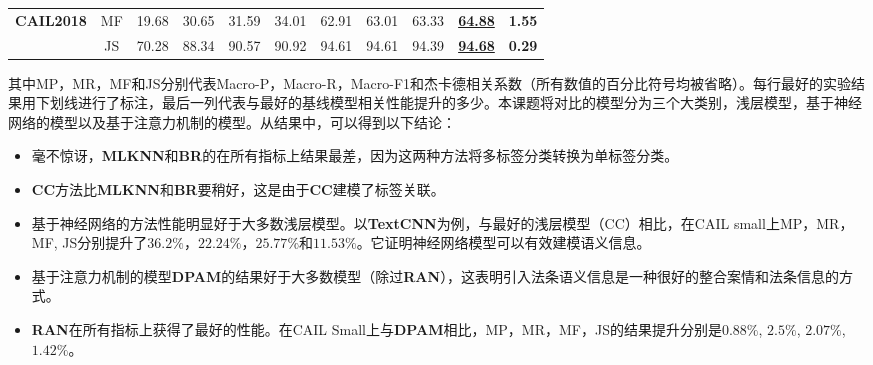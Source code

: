 \begin{table*}[htbp]
\begin{tabular}{@{}c|c|cccc|cc|c|c|c@{}}
        \textbf{CAIL2018}                 & MF                               & 19.68                    & 30.65                    & 31.59                   & 34.01                   & 62.91                                                     & 63.01                                                    & 63.33                                                                                      & \underline{\textbf{64.88}}                                                               & \textbf{1.55}                     \\
                                          & JS                                & 70.28                    & 88.34                    & 90.57                   & 90.92                   & 94.61                                                     & 94.61                                                    & 94.39                                                                                      & \underline{\textbf{94.68}}                                                                & \textbf{0.29}                     \\ \bottomrule
        \end{tabular}
\end{table*}


其中MP，MR，MF和JS分别代表Macro-P，Macro-R，Macro-F1和杰卡德相关系数（所有数值的百分比符号均被省略）。每行最好的实验结果用下划线进行了标注，最后一列代表与最好的基线模型相关性能提升的多少。本课题将对比的模型分为三个大类别，浅层模型，基于神经网络的模型以及基于注意力机制的模型。从结果中，可以得到以下结论：
\begin{itemize}
    \item 毫不惊讶，\textbf{MLKNN}和\textbf{BR}的在所有指标上结果最差，因为这两种方法将多标签分类转换为单标签分类。
    \item \textbf{CC}方法比\textbf{MLKNN}和\textbf{BR}要稍好，这是由于\textbf{CC}建模了标签关联。
    \item 基于神经网络的方法性能明显好于大多数浅层模型。以\textbf{TextCNN}为例，与最好的浅层模型（CC）相比，在CAIL small上MP，MR，MF, JS分别提升了$36.2\%$，$22.24\%$，$25.77\%$和$11.53\%$。它证明神经网络模型可以有效建模语义信息。
    \item 基于注意力机制的模型\textbf{DPAM}的结果好于大多数模型（除过\textbf{RAN}），这表明引入法条语义信息是一种很好的整合案情和法条信息的方式。
    \item \textbf{RAN}在所有指标上获得了最好的性能。在CAIL Small上与\textbf{DPAM}相比，MP，MR，MF，JS的结果提升分别是$0.88\%$, $2.5\%$, $2.07\%$, $1.42\%$。
\end{itemize}

